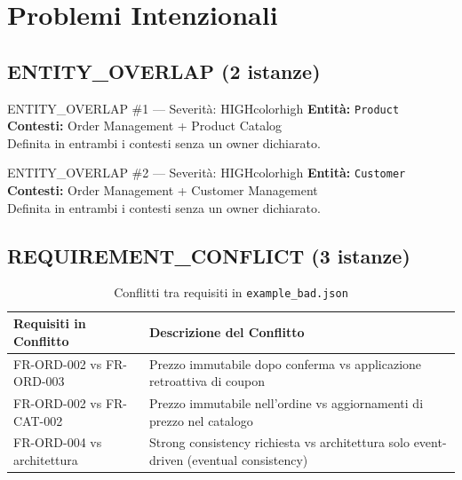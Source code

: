 \documentclass[12pt,a4paper]{report}
\begin{document}
\section{Problemi Intenzionali}

\subsection{ENTITY\_OVERLAP (2 istanze)}

\begin{issuebox}{ENTITY\_OVERLAP \#1 --- Severità: HIGH}{colorhigh}
\textbf{Entità:} \texttt{Product} \\
\textbf{Contesti:} Order Management + Product Catalog \\
Definita in entrambi i contesti senza un owner dichiarato.
\end{issuebox}

\vspace{0.5em}

\begin{issuebox}{ENTITY\_OVERLAP \#2 --- Severità: HIGH}{colorhigh}
\textbf{Entità:} \texttt{Customer} \\
\textbf{Contesti:} Order Management + Customer Management \\
Definita in entrambi i contesti senza un owner dichiarato.
\end{issuebox}

\subsection{REQUIREMENT\_CONFLICT (3 istanze)}

\begin{table}[H]
\centering
\renewcommand{\arraystretch}{1.4}
\begin{tabularx}{\textwidth}{l X}
\toprule
\textbf{Requisiti in Conflitto} & \textbf{Descrizione del Conflitto} \\
\midrule
FR-ORD-002 vs FR-ORD-003 & Prezzo immutabile dopo conferma vs applicazione retroattiva di coupon \\
FR-ORD-002 vs FR-CAT-002 & Prezzo immutabile nell'ordine vs aggiornamenti di prezzo nel catalogo \\
FR-ORD-004 vs architettura & Strong consistency richiesta vs architettura solo event-driven (eventual consistency) \\
\bottomrule
\end{tabularx}
\caption{Conflitti tra requisiti in \texttt{example\_bad.json}}
\label{tab:req-conflicts}
\end{table}
\end{document}
